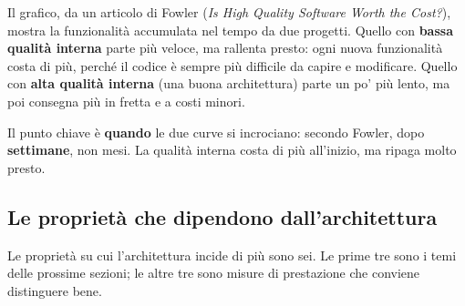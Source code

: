 \noindent\begin{minipage}[c]{0.44\textwidth}
Il grafico, da un articolo di Fowler (\textit{Is High Quality Software Worth the Cost?}), mostra la funzionalità
accumulata nel tempo da due progetti. Quello con \textbf{bassa qualità interna} parte più veloce, ma rallenta presto:
ogni nuova funzionalità costa di più, perché il codice è sempre più difficile da capire e modificare. Quello con
\textbf{alta qualità interna} (una buona architettura) parte un po' più lento, ma poi consegna più in fretta e a costi
minori.

Il punto chiave è \textbf{quando} le due curve si incrociano: secondo Fowler, dopo \textbf{settimane}, non mesi. La qualità
interna costa di più all'inizio, ma ripaga molto presto.
\end{minipage}\hfill
\begin{minipage}[c]{0.53\textwidth}
\centering
{}
\end{minipage}

\subsection{Le proprietà che dipendono dall'architettura}

Le proprietà su cui l'architettura incide di più sono sei. Le prime tre sono i temi delle prossime sezioni; le altre tre
sono misure di prestazione che conviene distinguere bene.

